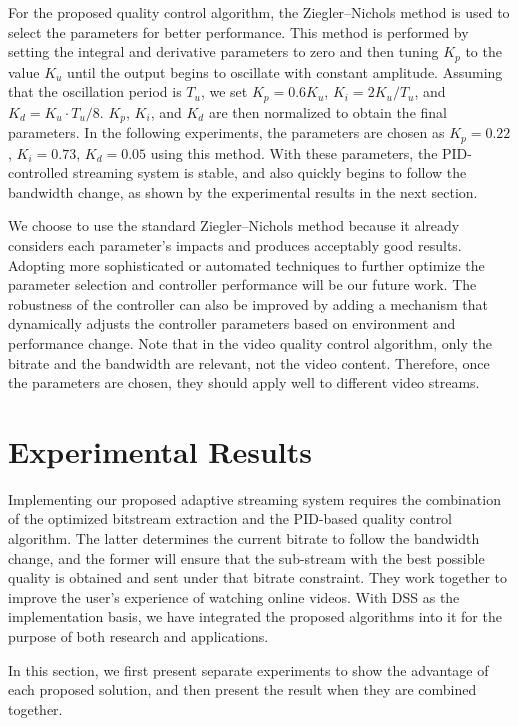 \documentclass[journal,draftclsnofoot,onecolumn]{IEEEtran}
\begin{document}
For the proposed quality control algorithm, the Ziegler--Nichols method \cite{Ziegler42} is used to select the parameters for better performance. This method is performed by setting the integral and derivative parameters to zero and then tuning $K_p$ to the value $K_u$ until the output begins to oscillate with constant amplitude. Assuming that the oscillation period is $T_u$, we set $K_p = 0.6K_u$, $K_i = 2K_u/T_u$, and $K_d = K_u \cdot T_u/8$. $K_p$, $K_i$, and $K_d$ are then normalized to obtain the final parameters. In the following experiments, the parameters are chosen as $K_p = 0.22$, $K_i = 0.73$, $K_d = 0.05$ using this method. With these parameters, the PID-controlled streaming system is stable, and also quickly begins to follow the bandwidth change, as shown by the experimental results in the next section.

We choose to use the standard Ziegler--Nichols method because it already considers each parameter's impacts and produces acceptably good results. Adopting more sophisticated or automated techniques to further optimize the parameter selection and controller performance will be our future work. The robustness of the controller can also be improved by adding a mechanism that dynamically adjusts the controller parameters based on environment and performance change. Note that in the video quality control algorithm, only the bitrate and the bandwidth are relevant, not the video content. Therefore, once the parameters are chosen, they should apply well to different video streams.


\section{Experimental Results}
\label{sec:experiment}

Implementing our proposed adaptive streaming system requires the combination of the optimized bitstream extraction and the PID-based quality control algorithm. The latter determines the current bitrate to follow the bandwidth change, and the former will ensure that the sub-stream with the best possible quality is obtained and sent under that bitrate constraint. They work together to improve the user's experience of watching online videos. With DSS as the implementation basis, we have integrated the proposed algorithms into it for the purpose of both research and applications.

In this section, we first present separate experiments to show the advantage of each proposed solution, and then present the result when they are combined together.
\end{document}
